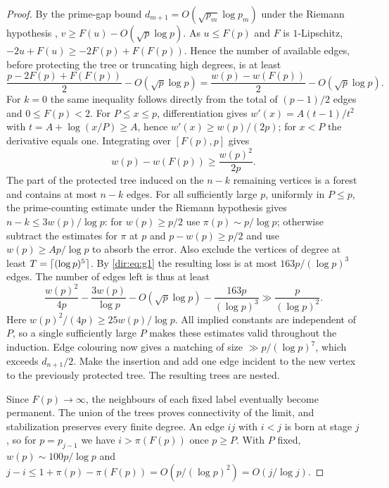 \begin{proof}
By the prime-gap bound $d_{m+1}=O(\sqrt{p_m}\log p_m)$ under the Riemann hypothesis
\cite[Theorem~2.3]{ErdosEtAl2024Sequence}, $v\ge F(u)-O(\sqrt p\log p)$. As
$u\le F(p)$ and $F$ is $1$-Lipschitz, $-2u+F(u)\ge-2F(p)+F(F(p))$. Hence the number of
available edges, before protecting the tree or truncating high degrees, is at least
\[
 \frac{p-2F(p)+F(F(p))}{2}-O(\sqrt p\log p)
 =\frac{w(p)-w(F(p))}{2}-O(\sqrt p\log p).
\]
For $k=0$ the same inequality follows directly from the total of $(p-1)/2$ edges and
$0\le F(p)<2$. For $P\le x\le p$, differentiation gives $w'(x)=A(t-1)/t^2$ with
$t=A+\log(x/P)\ge A$, hence $w'(x)\ge w(p)/(2p)$; for $x<P$ the derivative equals one.
Integrating over $[F(p),p]$ gives
\[
 w(p)-w(F(p))\ge\frac{w(p)^2}{2p}.
\]
The part of the protected tree induced on the $n-k$ remaining vertices is a forest and
contains at most $n-k$ edges. For all sufficiently large $p$, uniformly in $P\le p$,
the prime-counting estimate under the Riemann hypothesis gives $n-k\le3w(p)/\log p$:
for $w(p)\ge p/2$ use $\pi(p)\sim p/\log p$; otherwise subtract the estimates for $\pi$
at $p$ and $p-w(p)\ge p/2$ and use $w(p)\ge Ap/\log p$ to absorb the error. Also
exclude the vertices of degree at least $T=\lceil(\log p)^5\rceil$. By \eqref{dir:eq:g1} the
resulting loss is at most $163p/(\log p)^3$ edges. The number of edges left is thus at
least
\[
 \frac{w(p)^2}{4p}-\frac{3w(p)}{\log p}-O(\sqrt p\log p)-\frac{163p}{(\log p)^3}
 \gg\frac{p}{(\log p)^2}.
\]
Here $w(p)^2/(4p)\ge25w(p)/\log p$. All implied constants are independent of $P$, so a
single sufficiently large $P$ makes these estimates valid throughout the induction.
Edge colouring now gives a matching of size $\gg p/(\log p)^7$, which exceeds
$d_{n+1}/2$. Make the insertion and add one edge incident to the new vertex to the
previously protected tree. The resulting trees are nested.

Since $F(p)\to\infty$, the neighbours of each fixed label eventually become permanent.
The union of the trees proves connectivity of the limit, and stabilization preserves
every finite degree. An edge $ij$ with $i<j$ is born at stage $j$, so for $p=p_{j-1}$
we have $i>\pi(F(p))$ once $p\ge P$. With $P$ fixed, $w(p)\sim100p/\log p$ and
$j-i\le1+\pi(p)-\pi(F(p))=O(p/(\log p)^2)=O(j/\log j)$.
\end{proof}

